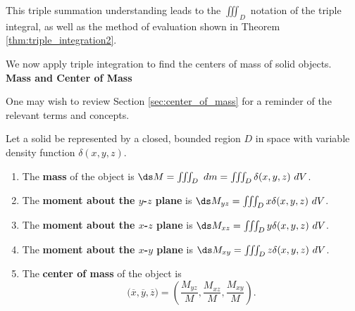 This triple summation understanding leads to the $\iiint_D$ notation of the triple integral, as well as the method of evaluation shown in Theorem \ref{thm:triple_integration2}.

 We now apply triple integration to find the centers of mass of solid objects.\\

\noindent\textbf{\large Mass and Center of Mass}

One may wish to review Section \ref{sec:center_of_mass} for a reminder of the relevant terms and concepts. 

{Let a solid be represented by a closed, bounded region $D$ in space with variable density function $\delta(x,y,z)$. 
\begin{enumerate}
	\item The \textbf{mass} of the object is $\ds M= \iiint_D \ dm=\iiint_D \delta(x,y,z)\ dV$.
	\item	The \textbf{moment about the $y$-$z$ plane} is $\ds M_{yz}=\iiint_D x\delta(x,y,z)\ dV$.
	\item	The \textbf{moment about the $x$-$z$ plane} is $\ds M_{xz}=\iiint_D y\delta(x,y,z)\ dV$.
	\item	The \textbf{moment about the $x$-$y$ plane} is $\ds M_{xy}=\iiint_D z\delta(x,y,z)\ dV$.
	\item The \textbf{center of mass} of the object is
	$$\big(\overline{x},\overline{y},\overline{z}\big) = \left(\frac{M_{yz}}M,\frac{M_{xz}}M,\frac{M_{xy}}M\right).$$
\end{enumerate}
}

